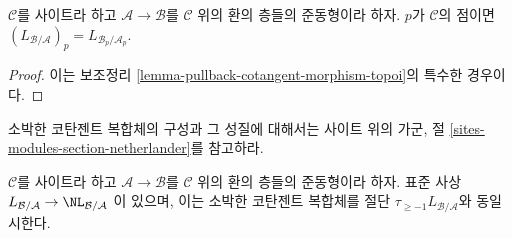 \begin{lemma}
\label{lemma-stalk-cotangent-complex}
$\mathcal{C}$를 사이트라 하고 $\mathcal{A} \to \mathcal{B}$를
$\mathcal{C}$ 위의 환의 층들의 준동형이라 하자. $p$가 $\mathcal{C}$의
점이면
$(L_{\mathcal{B}/\mathcal{A}})_p = L_{\mathcal{B}_p/\mathcal{A}_p}$.
\end{lemma}

\begin{proof}
이는 보조정리 \ref{lemma-pullback-cotangent-morphism-topoi}의 특수한
경우이다.
\end{proof}

\noindent
소박한 코탄젠트 복합체의 구성과 그 성질에 대해서는 사이트 위의 가군,
절 \ref{sites-modules-section-netherlander}를 참고하라.

\begin{lemma}
\label{lemma-compare-cotangent-complex-with-naive}
$\mathcal{C}$를 사이트라 하고 $\mathcal{A} \to \mathcal{B}$를
$\mathcal{C}$ 위의 환의 층들의 준동형이라 하자. 표준 사상
$L_{\mathcal{B}/\mathcal{A}} \to \NL_{\mathcal{B}/\mathcal{A}}$
이 있으며, 이는 소박한 코탄젠트 복합체를 절단
$\tau_{\geq -1}L_{\mathcal{B}/\mathcal{A}}$와 동일시한다.
\end{lemma}

